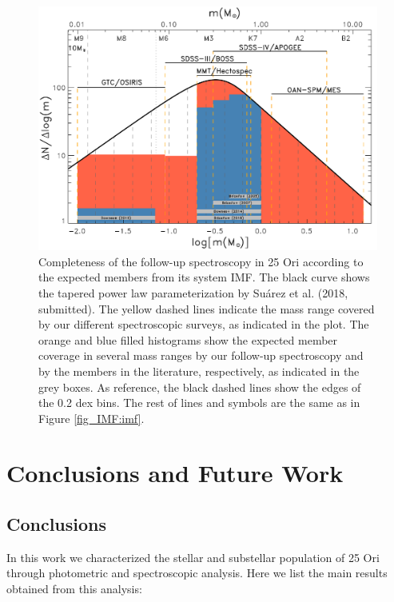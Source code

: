 \documentclass[12pt]{article}
\begin{document}
\begin{figure}%
	\includegraphics[width=1.0\textwidth]{survey_completeness.pdf}
	\caption[Completeness of the follow-up spectroscopy in 25 Ori.]{Completeness of the follow-up spectroscopy in 25 Ori according to the expected members from its system IMF. The black curve shows the tapered power law parameterization by Su\'arez et al. (2018, submitted). The yellow dashed lines indicate the mass range covered by our different spectroscopic surveys, as indicated in the plot. The orange and blue filled histograms show the expected member coverage in several mass ranges by our follow-up spectroscopy and by the members in the literature, respectively, as indicated in the grey boxes. As reference, the black dashed lines show the edges of the 0.2 dex bins. The rest of lines and symbols are the same as in Figure \ref{fig_IMF:imf}.}
	\label{fig:completeness}
\end{figure}

\section{Conclusions and Future Work}
\label{sec:conclusions}

\subsection{Conclusions}
In this work we characterized the stellar and substellar population of 25 Ori through photometric and spectroscopic analysis. Here we list the main results obtained from this analysis:\\
\end{document}
